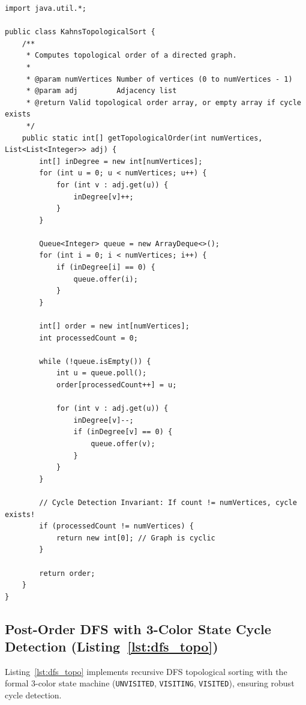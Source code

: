 \documentclass[10pt,journal,compsoc,onecolumn]{IEEEtran}
\begin{document}
\begin{lstlisting}[caption={Kahn's Algorithm for Topological Sort and Cycle Detection}, label={lst:kahns}]
import java.util.*;

public class KahnsTopologicalSort {
    /**
     * Computes topological order of a directed graph.
     *
     * @param numVertices Number of vertices (0 to numVertices - 1)
     * @param adj         Adjacency list
     * @return Valid topological order array, or empty array if cycle exists
     */
    public static int[] getTopologicalOrder(int numVertices, List<List<Integer>> adj) {
        int[] inDegree = new int[numVertices];
        for (int u = 0; u < numVertices; u++) {
            for (int v : adj.get(u)) {
                inDegree[v]++;
            }
        }

        Queue<Integer> queue = new ArrayDeque<>();
        for (int i = 0; i < numVertices; i++) {
            if (inDegree[i] == 0) {
                queue.offer(i);
            }
        }

        int[] order = new int[numVertices];
        int processedCount = 0;

        while (!queue.isEmpty()) {
            int u = queue.poll();
            order[processedCount++] = u;

            for (int v : adj.get(u)) {
                inDegree[v]--;
                if (inDegree[v] == 0) {
                    queue.offer(v);
                }
            }
        }

        // Cycle Detection Invariant: If count != numVertices, cycle exists!
        if (processedCount != numVertices) {
            return new int[0]; // Graph is cyclic
        }

        return order;
    }
}
\end{lstlisting}

\subsection{Post-Order DFS with 3-Color State Cycle Detection (Listing~\ref{lst:dfs_topo})}
Listing~\ref{lst:dfs_topo} implements recursive DFS topological sorting with the formal 3-color state machine (\texttt{UNVISITED}, \texttt{VISITING}, \texttt{VISITED}), ensuring robust cycle detection.
\end{document}

